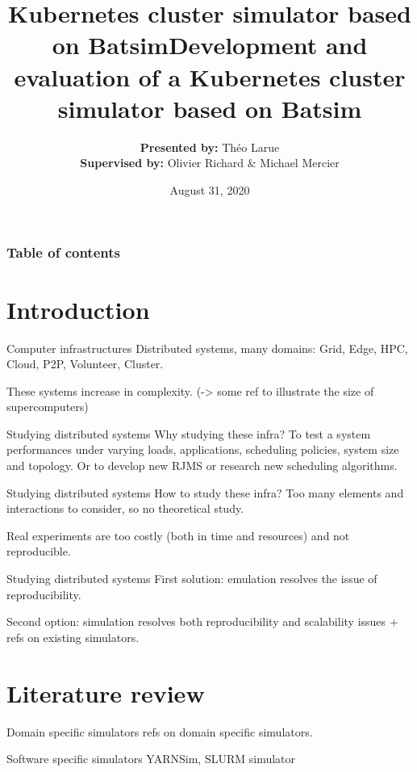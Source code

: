 \documentclass[12pt, aspectratio=43]{beamer}
\title{Kubernetes cluster simulator based on Batsim}
\title{Development and evaluation of a Kubernetes cluster simulator based on
Batsim}
\author{\textbf{Presented by:} Théo Larue\\\textbf{Supervised by:} Olivier
Richard \& Michael Mercier}
\date{August 31, 2020}
\institute[Théo LARUE]{Université Grenoble Alpes}
\begin{document}
\frame{\titlepage}

\begin{frame}\frametitle{Table of contents}\tableofcontents
\end{frame}

\section{Introduction}
\begin{frame}{Computer infrastructures}
	Distributed systems, many domains: Grid, Edge, HPC, Cloud, P2P, Volunteer, Cluster. 

	These systems increase in complexity. (-> some ref to illustrate the
	size of supercomputers)
\end{frame}

\begin{frame}{Studying distributed systems}
	Why studying these infra? To test a system performances under varying
	loads, applications, scheduling policies, system size and topology. Or
	to develop new RJMS or research new scheduling algorithms.
\end{frame}

\begin{frame}{Studying distributed systems}
	How to study these infra? Too many elements and interactions to
	consider, so no theoretical study. 

	Real experiments are too costly (both in time and resources) and not
	reproducible.
\end{frame}

\begin{frame}{Studying distributed systems}
	First solution: emulation resolves the issue of reproducibility.

	Second option: simulation resolves both reproducibility and scalability
	issues + refs on existing simulators.
\end{frame}

\section{Literature review}
\begin{frame}{Domain specific simulators}
	refs on domain specific simulators.
\end{frame}

\begin{frame}{Software specific simulators}
	YARNSim, SLURM simulator
\end{frame}
\end{document}
